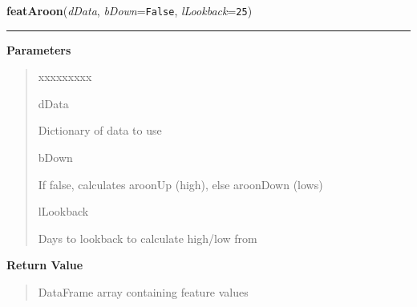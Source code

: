 \hspace{.8\funcindent}\begin{boxedminipage}{\funcwidth}

    \raggedright \textbf{featAroon}(\textit{dData}, \textit{bDown}={\tt False}, \textit{lLookback}={\tt 25})

    \vspace{-1.5ex}

    \rule{\textwidth}{0.5\fboxrule}
\setlength{\parskip}{2ex}
\setlength{\parskip}{1ex}
      \textbf{Parameters}
      \vspace{-1ex}

      \begin{quote}
        \begin{Ventry}{xxxxxxxxx}

          \item[dData]

          Dictionary of data to use

          \item[bDown]

          If false, calculates aroonUp (high), else aroonDown (lows)

          \item[lLookback]

          Days to lookback to calculate high/low from

        \end{Ventry}

      \end{quote}

      \textbf{Return Value}
    \vspace{-1ex}

      \begin{quote}
      DataFrame array containing feature values

      \end{quote}

    \end{boxedminipage}

    \label{QSTK:qstkfeat:features:featStochastic}

    \vspace{0.5ex}

